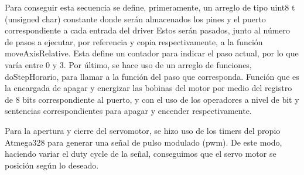 Para conseguir esta secuencia se define, primeramente, un arreglo de tipo uint8 t (unsigned char) constante donde serán almacenados los pines y el puerto correspondiente a cada entrada del driver
Estos serán pasados, junto al número de pasos a ejecutar, por referencia y copia respectivamente, a la función moveAxisRelative. Esta define un contador para indicar el paso actual, por lo que varía entre 0 y 3. Por último, se hace uso de un arreglo de funciones, doStepHorario, para llamar a la función del paso que corresponda. Función que es la encargada de apagar y energizar las bobinas del motor por medio del registro de 8 bits correspondiente al puerto, y con el uso de los operadores a nivel de bit y sentencias correspondientes para apagar y encender respectivamente.
\par
Para la apertura y cierre del servomotor, se hizo uso de los timers del propio Atmega328 para generar una señal de pulso modulado (pwm). De este modo, 
haciendo variar el duty cycle de la señal, conseguimos que el servo motor se posición según lo deseado. 

